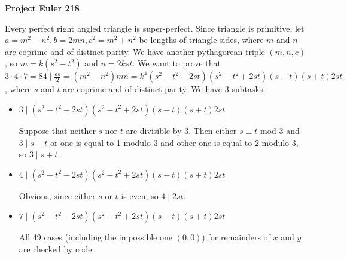 \documentclass[a4paper,12pt]{article}
\begin{document}
\setlength\parindent{0pt}
\textbf{Project Euler 218}
\vspace{5ex}

Every perfect right angled triangle is super-perfect. Since triangle is primitive, let \(a = m^2 - n^2, b = 2mn, c^2 = m^2 + n^2\) be lengths of triangle sides, where \(m\) and \(n\) are coprime and of distinct parity. We have another pythagorean triple \((m, n, c)\), so \(m = k(s^2 - t^2)\) and \(n = 2kst\). We want to prove that \(3 \cdot 4 \cdot 7 = 84 \mid \frac{ab}{2} = (m^2 - n^2)mn = k^4(s^2 - t^2 - 2st)(s^2 - t^2 + 2st)(s - t)(s + t)2st\), where \(s\) and \(t\) are coprime and of distinct parity. We have 3 subtasks:
\begin{itemize}
\item \(3 \mid (s^2 - t^2 - 2st)(s^2 - t^2 + 2st)(s - t)(s + t)2st\)

Suppose that neither \(s\) nor \(t\) are divisible by 3. Then either \(s \equiv t\) mod 3 and \(3 \mid s - t\) or one is equal to 1 modulo 3 and other one is equal to 2 modulo 3, so \(3 \mid s + t\).
\item \(4 \mid (s^2 - t^2 - 2st)(s^2 - t^2 + 2st)(s - t)(s + t)2st\)

Obvious, since either \(s\) or \(t\) is even, so \(4 \mid 2st\).
\item \(7 \mid (s^2 - t^2 - 2st)(s^2 - t^2 + 2st)(s - t)(s + t)2st\)

All 49 cases (including the impossible one \((0, 0)\)) for remainders of \(x\) and \(y\) are checked by code.
\end{itemize}
\end{document}
